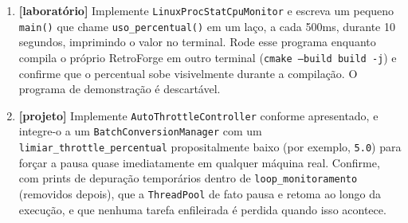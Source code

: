 \begin{CaixaDesafio}
\begin{enumerate}[label=\textbf{4.\arabic*}]
    \item \textbf{[laboratório]} Implemente \texttt{LinuxProcStatCpuMonitor} e escreva um pequeno \texttt{main()} que chame \texttt{uso\_percentual()} em um laço, a cada 500ms, durante 10 segundos, imprimindo o valor no terminal. Rode esse programa enquanto compila o próprio RetroForge em outro terminal (\texttt{cmake --build build -j}) e confirme que o percentual sobe visivelmente durante a compilação. O programa de demonstração é descartável.
    \item \textbf{[projeto]} Implemente \texttt{AutoThrottleController} conforme apresentado, e integre-o a um \texttt{BatchConversionManager} com um \texttt{limiar\_throttle\_percentual} propositalmente baixo (por exemplo, \texttt{5.0}) para forçar a pausa quase imediatamente em qualquer máquina real. Confirme, com prints de depuração temporários dentro de \texttt{loop\_monitoramento} (removidos depois), que a \texttt{ThreadPool} de fato pausa e retoma ao longo da execução, e que nenhuma tarefa enfileirada é perdida quando isso acontece.
\end{enumerate}
\end{CaixaDesafio}

